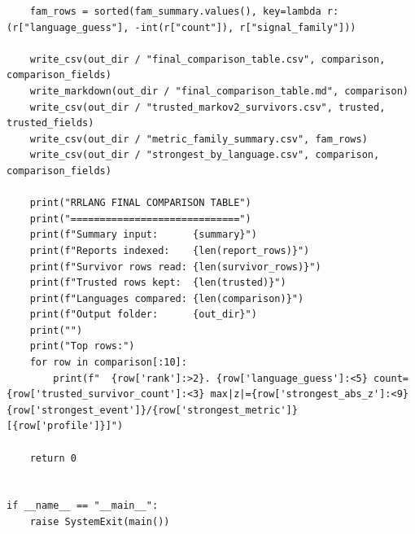 \documentclass[11pt,a4paper]{article}
\begin{document}
\begin{lstlisting}
    fam_rows = sorted(fam_summary.values(), key=lambda r: (r["language_guess"], -int(r["count"]), r["signal_family"]))

    write_csv(out_dir / "final_comparison_table.csv", comparison, comparison_fields)
    write_markdown(out_dir / "final_comparison_table.md", comparison)
    write_csv(out_dir / "trusted_markov2_survivors.csv", trusted, trusted_fields)
    write_csv(out_dir / "metric_family_summary.csv", fam_rows)
    write_csv(out_dir / "strongest_by_language.csv", comparison, comparison_fields)

    print("RRLANG FINAL COMPARISON TABLE")
    print("=============================")
    print(f"Summary input:      {summary}")
    print(f"Reports indexed:    {len(report_rows)}")
    print(f"Survivor rows read: {len(survivor_rows)}")
    print(f"Trusted rows kept:  {len(trusted)}")
    print(f"Languages compared: {len(comparison)}")
    print(f"Output folder:      {out_dir}")
    print("")
    print("Top rows:")
    for row in comparison[:10]:
        print(f"  {row['rank']:>2}. {row['language_guess']:<5} count={row['trusted_survivor_count']:<3} max|z|={row['strongest_abs_z']:<9} {row['strongest_event']}/{row['strongest_metric']} [{row['profile']}]")

    return 0


if __name__ == "__main__":
    raise SystemExit(main())
\end{lstlisting}
\end{document}
